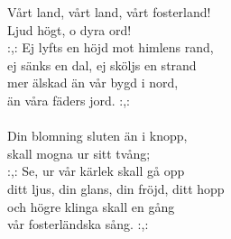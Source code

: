 
            Vårt land, vårt land, vårt fosterland! \\
            Ljud högt, o dyra ord! \\
            :,: Ej lyfts en höjd mot himlens rand, \\
            ej sänks en dal, ej sköljs en strand \\
            mer älskad än vår bygd i nord, \\
            än våra fäders jord. :,: \\
\hspace{10mm} \\
            Din blomning sluten än i knopp, \\
            skall mogna ur sitt tvång; \\
            :,: Se, ur vår kärlek skall gå opp \\
            ditt ljus, din glans, din fröjd, ditt hopp \\
            och högre klinga skall en gång \\
            vår fosterländska sång. :,: \\
